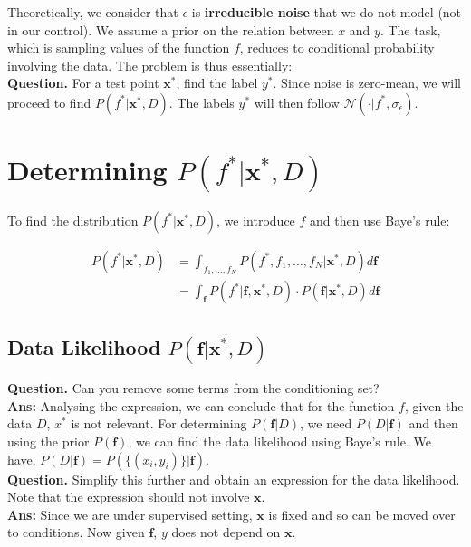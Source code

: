 \documentclass[12pt]{article}
\begin{document}
\noindent Theoretically, we consider that $\epsilon$ is \textbf{irreducible noise} that we do not model (not in our control). We assume a prior on the relation between $x$ and $y$. The task, which is sampling values of the function $f$, reduces to conditional probability involving the data. The problem is thus essentially: \\

\noindent \textbf{Question.} For a test point $\mathbf{x}^*$, find the label $y^*$. Since noise is zero-mean, we will proceed to find $P(f^*|\mathbf{x}^*,D)$. The labels $y^*$ will then follow $\mathcal{N}(\cdot | f^*, \sigma_\epsilon)$.

\section{Determining $P(f^*|\mathbf{x}^*,D)$}

To find the distribution $P(f^*|\mathbf{x}^*,D)$, we introduce $f$ and then use Baye's rule:

\vspace{-1em}

\begin{align*}
    P(f^*|\mathbf{x}^*,D) &= \int_{f_1, \dots, f_N} P(f^*,f_1,\dots,f_N|\mathbf{x}^*,D) d\mathbf{f} \\
    &= \int_{\mathbf{f}} P(f^*|\mathbf{f},\mathbf{x}^*,D) \cdot P(\mathbf{f}|\mathbf{x}^*,D) d\mathbf{f}
\end{align*}

\subsection{Data Likelihood $P(\mathbf{f}|\mathbf{x}^*,D)$}

\textbf{Question.} Can you remove some terms from the conditioning set? \\
\noindent \textbf{Ans:\hspace{3mm}} Analysing the expression, we can conclude that for the function $f$, given the data $D$, $x^*$ is not relevant. For determining $P(\mathbf{f}|D)$, we need $P(D|\mathbf{f})$ and then using the prior $P(\mathbf{f})$, we can find the data likelihood using Baye's rule. We have, $P(D|\mathbf{f}) = P(\{(x_i,y_i)\} | \mathbf{f})$. \\

\noindent \textbf{Question.} Simplify this further and obtain an expression for the data likelihood. Note that the expression should not involve $\mathbf{x}$. \\
\noindent \textbf{Ans:\hspace{3mm}} Since we are under supervised setting, $\mathbf{x}$ is fixed and so can be moved over to conditions. Now given $\mathbf{f}$, $y$ does not depend on $\mathbf{x}$.
\end{document}
